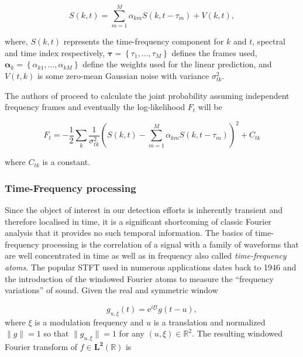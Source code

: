 \begin{equation}
\label{eq:Subramanya2007}
S(k,t) = \sum_{m=1}^M \alpha_{km} S(k,t - \tau_m) + V(k,t),
\end{equation}

where, $S(k,t)$ represents the time-frequency component for $k$ and $t$, spectral and time index respectively, $\boldsymbol{\tau} = \left\{\tau_1, \ldots ,\tau_M \right\}$ defines the frames used, $\boldsymbol{\alpha}_k = \left\{\alpha_{k1},\ldots,\alpha_{kM} \right\}$ define the weights used for the linear prediction, and $V(t,k)$ is some zero-mean Gaussian noise with variance $\sigma^2_{tk}$.

The authors of \cite{Subramanya2007} proceed to calculate the joint probability assuming independent frequency frames and eventually the log-likelihood $F_t$ will be

\begin{equation}
\label{eq:Subramanya2007_2}
F_t = - \frac{1}{2} \sum_k \frac{1}{\sigma^2_{tk}} \left( S\left(k,t\right) - \sum_{m=1}^M \alpha_{km} S(k,t-\tau_m)\right)^2 + C_{tk}
\end{equation}

where $C_{tk}$ is a constant.

\subsubsection{Time-Frequency processing}
Since the object of interest in our detection efforts is inherently transient and therefore localised in time, it is a significant shortcoming of classic Fourier analysis that it provides no such temporal information. The basics of time-frequency processing is the correlation of a signal with a family of waveforms that are well concentrated in time as well as in frequency\cite{Mallat1999} also called \emph{time-frequency atoms}\cite{Gabor1946}. The popular STFT used in numerous applications dates back to 1946 and the introduction of the windowed Fourier atoms to measure the ``frequency variations'' of sound. Given the real and symmetric window

\begin{equation}\label{eq:Mallat1999}
g_{u,\xi}(t) = \mathrm{e}^{i\xi t}g(t-u),
\end{equation}
where $\xi$ is a modulation frequency and $u$ is a translation and normalized $\|g\| = 1$ so that $\|g_{u,\xi}\| = 1$ for any $(u, \xi) \in \mathbb{R}^2$. The resulting windowed Fourier transform of $f \in \mathbf{L^2}(\mathbb{R})$ is

